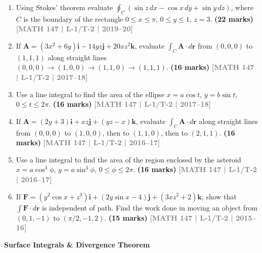 \documentclass[12pt,a4paper]{article}
\newcommand{\yr}[1]{\hfill\textcolor{gray}{\small\textbf{[#1]}}}
\newcommand{\mk}[1]{\textcolor{orange!70!black}{\small\textbf{(#1 marks)}}}
\newcommand{\subtopic}[2]{%
  \vspace{10pt}
  \noindent\begin{tcolorbox}[colback=#1!8,colframe=#1,boxrule=0.6pt,arc=4pt,
    left=6pt,right=6pt,top=4pt,bottom=4pt]
    \small\bfseries\textcolor{#1}{#2}
  \end{tcolorbox}
  \vspace{2pt}
}
\begin{document}
\begin{enumerate}
\item Using Stokes' theorem evaluate $\oint_{C}(\sin z\,dx - \cos x\,dy + \sin y\,dz)$, where $C$ is the boundary of the rectangle $0\le x\le\pi$, $0\le y\le 1$, $z=3$.
\mk{22} \yr{MATH 147 | L-1/T-2 | 2019--20}

\item If $\mathbf{A}=(3x^{2}+6y)\mathbf{i}-14yz\mathbf{j}+20xz^{2}\mathbf{k}$, evaluate $\int_{C}\mathbf{A}\cdot d\mathbf{r}$ from $(0,0,0)$ to $(1,1,1)$ along straight lines $(0,0,0)\to(1,0,0)\to(1,1,0)\to(1,1,1)$.
\mk{16} \yr{MATH 147 | L-1/T-2 | 2017--18}

\item Use a line integral to find the area of the ellipse $x=a\cos t$, $y=b\sin t$, $0\le t\le 2\pi$.
\mk{16} \yr{MATH 147 | L-1/T-2 | 2017--18}

\item If $\mathbf{A}=(2y+3)\mathbf{i}+xz\mathbf{j}+(yz-x)\mathbf{k}$, evaluate $\int_{C}\mathbf{A}\cdot d\mathbf{r}$ along straight lines from $(0,0,0)$ to $(1,0,0)$, then to $(1,1,0)$, then to $(2,1,1)$.
\mk{16} \yr{MATH 147 | L-1/T-2 | 2016--17}

\item Use a line integral to find the area of the region enclosed by the asteroid $x=a\cos^{3}\phi$, $y=a\sin^{3}\phi$, $0\le\phi\le 2\pi$.
\mk{16} \yr{MATH 147 | L-1/T-2 | 2016--17}

\item If $\mathbf{F}=(y^{2}\cos x+z^{3})\mathbf{i}+(2y\sin x-4)\mathbf{j}+(3xz^{2}+2)\mathbf{k}$, show that $\int\mathbf{F}\cdot d\mathbf{r}$ is independent of path. Find the work done in moving an object from $(0,1,-1)$ to $(\pi/2,-1,2)$.
\mk{15} \yr{MATH 147 | L-1/T-2 | 2015--16}

\end{enumerate}

\subtopic{cD}{Surface Integrals \& Divergence Theorem}
\label{sub:s4-surface}
\end{document}
